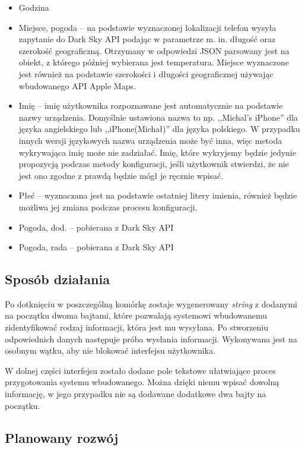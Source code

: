 \documentclass[a4paper,11pt]{article}
\begin{document}
\begin{itemize}
	\item Godzina
	\item Miejsce, pogoda -- na podstawie wyznaczonej lokalizacji telefon wysyła zapytanie do Dark Sky API podając w parametrze m. in. długość oraz szerokość geograficzną. Otrzymany w odpowiedzi JSON parsowany jest na obiekt, z którego później wybierana jest temperatura. Miejsce wyznaczone jest również na podstawie szerokości i długości geograficznej używając wbudowanego  API Apple Maps.
	\item Imię -- imię użytkownika rozpoznawane jest automatycznie na podstawie nazwy urządzenia. Domyślnie ustawiona nazwa to np. ,,Michal's iPhone'' dla języka angielskiego lub ,,iPhone(Michał)'' dla języka polskiego. W przypadku innych wersji językowych nazwa urządzenia może być inna, więc metoda wykrywająca imię może nie zadziałać. Imię, które wykryjemy będzie jedynie propozycją podczas metody konfiguracji, jeśli użytkownik stwierdzi, że nie jest ono zgodne z prawdą będzie mógł je ręcznie wpisać.
	\item Płeć -- wyznaczana jest na podstawie ostatniej litery imienia, również będzie możliwa jej zmiana podczas procesu konfiguracji.
	\item Pogoda, dod. -- pobierana z Dark Sky API
	\item Pogoda, rada -- pobierana z Dark Sky API
\end{itemize}

\subsection{Sposób działania}
Po dotknięciu w poszczególną komórkę zostaje wygenerowany \textit{string} z dodanymi na początku dwoma bajtami, które pozwalają systemowi wbudowanemu zidentyfikować rodzaj informacji, która jest mu wysyłana. Po stworzeniu odpowiednich danych następuje próba wysłania informacji. Wykonywana jest na osobnym wątku, aby nie blokować interfejsu użytkownika.

W dolnej części interfejsu zostało dodane pole tekstowe ułatwiające proces przygotowania systemu wbudowanego. Można dzięki niemu wpisać dowolną informację, w jego przypadku nie są dodawane dodatkowe dwa bajty na początku.

\subsection{Planowany rozwój}
\end{document}
